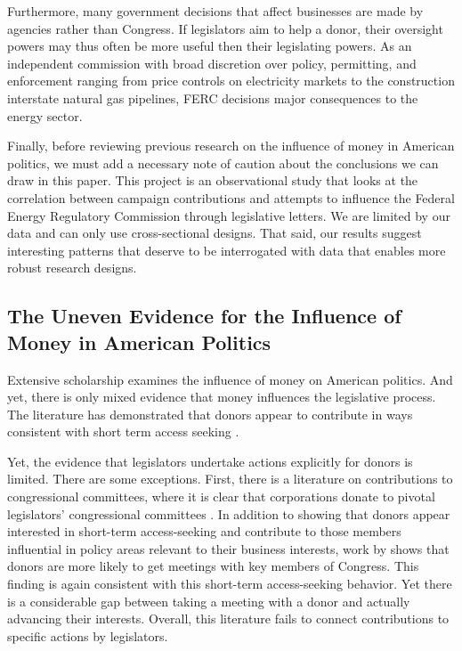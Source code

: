 \documentclass{article}
\begin{document}
Furthermore, many government decisions that affect businesses are made by agencies rather than Congress. If legislators aim to help a donor, their oversight powers may thus often be more useful then their legislating powers. As an independent commission with broad discretion over policy, permitting, and enforcement ranging from price controls on electricity markets to the construction interstate natural gas pipelines, FERC decisions major consequences to the energy sector.

Finally, before reviewing previous research on the influence of money in American politics, we must add a necessary note of caution about the conclusions we can draw in this paper.  This project is an observational study that looks at the correlation between campaign contributions and attempts to influence the Federal Energy Regulatory Commission through legislative letters.  We are limited by our data and can only use cross-sectional designs.  That said, our results suggest interesting patterns that deserve to be interrogated with data that enables more robust research designs. %

\subsection{The Uneven Evidence for the Influence of Money in American Politics}

Extensive scholarship examines the influence of money on American politics. And yet, there is only mixed evidence that money influences the legislative process. The literature has demonstrated that donors appear to contribute in ways consistent with short term access seeking \citep{Snyder1992, RomerSnyder1994, PowellGrimmer2016, Barber2016, FouirnaiesHall2018}.  

Yet, the evidence that legislators undertake actions explicitly for donors is limited.  There are some exceptions. First, there is a literature on contributions to congressional committees, where it is clear that corporations donate to pivotal legislators' congressional committees \citep{PowellGrimmer2016, BerryFowler2016}. 
In addition to showing that donors appear interested in short-term access-seeking and contribute to those members influential in policy areas relevant to their business interests, work by \citet{KallaBroockman2016} shows that donors are more likely to get meetings with key members of Congress.  This finding is again consistent with this short-term access-seeking behavior. Yet there is a considerable gap between taking a meeting with a donor and actually advancing their interests. Overall, this literature fails to connect contributions to specific actions by legislators. 
\end{document}
